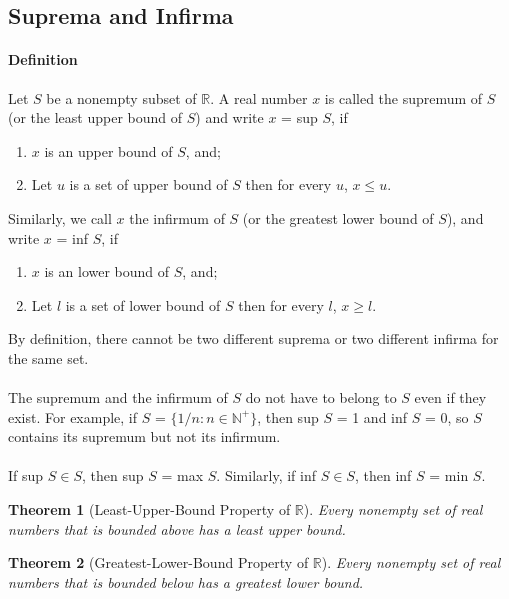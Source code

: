 \documentclass[12pt]{article}
\newtheorem{theorem}{Theorem}
\begin{document}
\subsection{Suprema and Infirma}
\paragraph{Definition} Let $S$ be a nonempty subset of $\mathbb{R}$. A real number $x$ is called the
supremum of $S$ (or the least upper bound of $S$) and write $x$ = sup $S$, if 
\begin{enumerate}[i] 
    \item $x$ is an upper bound of $S$, and;
    \item Let $u$ is a set of upper bound of $S$ then for every $u$, $x \leq u$.
\end{enumerate}
Similarly, we call $x$ the infirmum of $S$ (or the greatest lower bound of $S$), and write $x$ = inf $S$, if
\begin{enumerate}[i] 
    \item $x$ is an lower bound of $S$, and;
    \item Let $l$ is a set of lower bound of $S$ then for every $l$, $x \geq l$.
\end{enumerate}
By definition, there cannot be two different suprema or two different infirma for the same set. \\ \\
The supremum and the infirmum of $S$ do not have to belong to $S$ even if they exist.
For example, if $S$ = $\{1/n : n \in \mathbb{N}^+\}$, then sup $S$ = 1 and
inf $S$ = 0, so $S$ contains its supremum but not its infirmum. \\ \\
If sup $S \in S$, then sup $S$ = max $S$. Similarly, if
inf $S \in S$, then inf $S$ = min $S$. 

\begin{theorem}[Least-Upper-Bound Property of $\mathbb{R}$]
    Every nonempty set of real numbers that is bounded above has a
    least upper bound.
\end{theorem}
\begin{theorem}[Greatest-Lower-Bound Property of $\mathbb{R}$]
    Every nonempty set of real numbers that is bounded below has a
    greatest lower bound.
\end{theorem}
\end{document}

